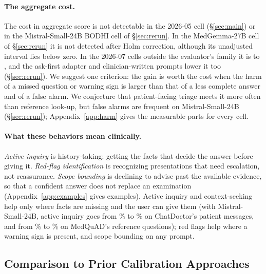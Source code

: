 \documentclass{article}
\newcommand{\bodhi}{BODHI}
\begin{document}
\paragraph{The aggregate cost.} The cost in aggregate score is not detectable in the 2026-05 cell
(\S\ref{sec:main}) or in the Mistral-Small-24B \bodhi{} cell of \S\ref{sec:rerun}. In the
MedGemma-27B cell of \S\ref{sec:rerun} it is not detected after Holm correction, although its
unadjusted interval lies below zero. In the 2026-07 cells outside the evaluator's family it is
\statGroupAddedOutsideFamilyRubricScoreLoRAvsBaseAbsMin{} to
\statGroupAddedOutsideFamilyRubricScoreLoRAvsBaseAbsMax, and the ask-first adapter and
clinician-written prompts lower it too (\S\ref{sec:rerun}). We suggest one criterion: the gain is
worth the cost when the harm of a missed question or warning sign is larger than that of a less
complete answer and of a false alarm. We conjecture that patient-facing triage meets it more often
than reference look-up, but false alarms are frequent on Mistral-Small-24B (\S\ref{sec:rerun});
Appendix~\ref{app:harm} gives the measurable parts for every cell.

\paragraph{What these behaviors mean clinically.} \emph{Active inquiry} is history-taking: getting
the facts that decide the answer before giving it. \emph{Red-flag identification} is recognizing
presentations that need escalation, not reassurance. \emph{Scope bounding} is declining to advise
past the available evidence, so that a confident answer does not replace an examination
(Appendix~\ref{app:examples} gives examples). Active
inquiry and context-seeking help only where facts are missing and the user can give them (with
Mistral-Small-24B, active inquiry goes from \statCDMistralJulActiveInquiryBase\% to
\statCDMistralJulActiveInquiryLoRA\% on ChatDoctor's patient messages, and from
\statMQMistralJulActiveInquiryBase\% to \statMQMistralJulActiveInquiryLoRA\% on MedQuAD's reference
questions); red flags help where a warning sign is present, and scope bounding on any prompt.

\subsection{Comparison to Prior Calibration Approaches}
\label{sec:prior}
\end{document}
